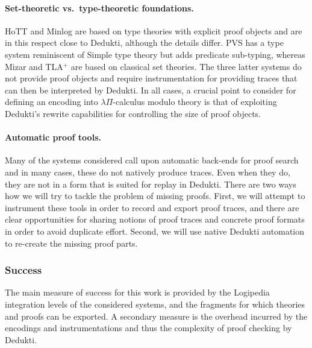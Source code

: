 \paragraph*{Set-theoretic vs.\ type-theoretic foundations.}
HoTT and Minlog are based on type theories with explicit proof objects
and are in this respect close to Dedukti, although the details differ. PVS has a
type system reminiscent of Simple type theory but adds predicate
sub-typing, whereas Mizar and TLA$^+$ are based on classical set theories. The
three latter systems do not provide proof objects and require instrumentation
for providing traces that can then be interpreted by Dedukti. In all cases, a
crucial point to consider for defining an encoding into $\lambda\Pi$-calculus
modulo theory is that of exploiting Dedukti's rewrite capabilities for
controlling the size of proof objects.

\paragraph*{Automatic proof tools.}
Many of the systems considered call upon automatic back-ends for proof
search and in many cases, these do not natively produce traces. Even
when they do, they are not in a form that is suited for replay in
Dedukti. There are two ways how we will try to tackle the problem of
missing proofs. First, we will attempt to instrument these tools in
order to record and export proof traces, and there are clear
opportunities for sharing notions of proof traces and concrete proof
formats in order to avoid duplicate effort. Second, we will use native
Dedukti automation to re-create the missing proof parts.

\subsubsection*{Success}

The main measure of success for this work is provided by the Logipedia
integration levels of the considered systems, and the fragments for which
theories and proofs can be exported. A secondary measure is the overhead
incurred by the encodings and instrumentations and thus the complexity of proof
checking by Dedukti.


